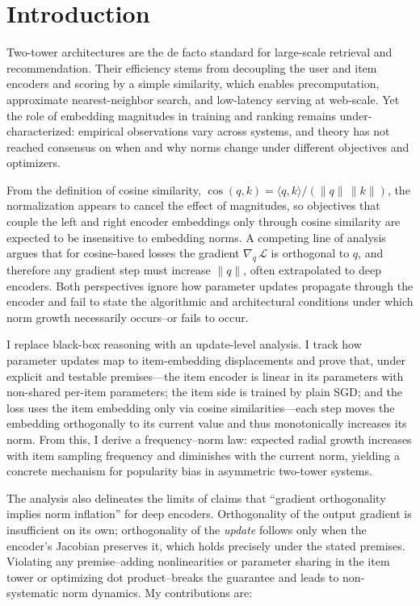 \section{Introduction}
Two-tower architectures are the de facto standard for large-scale retrieval and recommendation. Their efficiency stems from decoupling the user and item encoders and scoring by a simple similarity, which enables precomputation, approximate nearest-neighbor search, and low-latency serving at web-scale. Yet the role of embedding magnitudes in training and ranking remains under-characterized: empirical observations vary across systems, and theory has not reached consensus on when and why norms change under different objectives and optimizers.

From the definition of cosine similarity, \(\cos(q,k)=\langle q,k\rangle/(\|q\|\,\|k\|)\), the normalization appears to cancel the effect of magnitudes, so objectives that couple the left and right encoder embeddings only through cosine similarity are expected to be insensitive to embedding norms. A competing line of analysis argues that for cosine-based losses the gradient \(\nabla_{q}\,\mathcal{L}\) is orthogonal to \(q\), and therefore any gradient step must increase \(\|q\|\), often extrapolated to deep encoders. Both perspectives ignore how parameter updates propagate through the encoder and fail to state the algorithmic and architectural conditions under which norm growth necessarily occurs--or fails to occur.

I replace black-box reasoning with an update-level analysis. I track how parameter updates map to item-embedding displacements and prove that, under explicit and testable premises—the item encoder is linear in its parameters with non-shared per-item parameters; the item side is trained by plain SGD; and the loss uses the item embedding only via cosine similarities—each step moves the embedding orthogonally to its current value and thus monotonically increases its norm. From this, I derive a frequency--norm law: expected radial growth increases with item sampling frequency and diminishes with the current norm, yielding a concrete mechanism for popularity bias in asymmetric two-tower systems.

The analysis also delineates the limits of claims that ``gradient orthogonality implies norm inflation'' for deep encoders. Orthogonality of the output gradient is insufficient on its own; orthogonality of the \emph{update} follows only when the encoder's Jacobian preserves it, which holds precisely under the stated premises. Violating any premise--adding nonlinearities or parameter sharing in the item tower or optimizing dot product--breaks the guarantee and leads to non-systematic norm dynamics. My contributions are:

